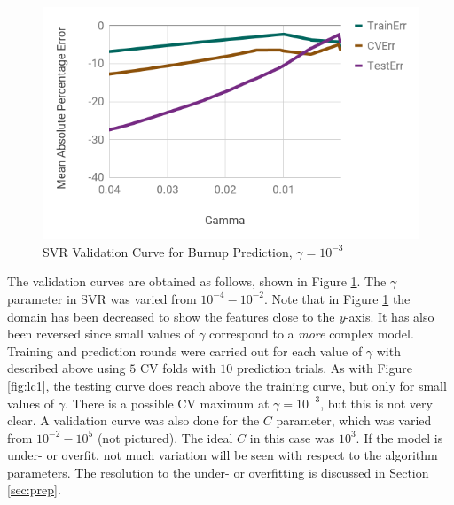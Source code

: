 \begin{figure}[!htb]
    \centering
    \includegraphics[width=\linewidth]{./chapters/method/vc1.png}
    \caption{\acrshort{SVR} Validation Curve for Burnup Prediction, $\gamma = 10^{-3}$}
    \label{fig:vc1}
\end{figure}

The validation curves are obtained as follows, shown in Figure \ref{fig:vc1}.
The $\gamma$ parameter in \gls{SVR} was varied from $10^{-4}-10^{-2}$.  Note
that in Figure \ref{fig:vc1} the domain has been decreased to show the features
close to the \textit{y}-axis.  It has also been reversed since small values of
$\gamma$ correspond to a \textit{more} complex model.  Training and prediction
rounds were carried out for each value of $\gamma$ with described above using
$5$ \gls{CV} folds with $10$ prediction trials.  As with Figure \ref{fig:lc1},
the testing curve does reach above the training curve, but only for small
values of $\gamma$.  There is a possible \gls{CV} maximum at $\gamma=10^{-3}$,
but this is not very clear.  A validation curve was also done for the $C$
parameter, which was varied from $10^{-2}-10^{5}$ (not pictured). The ideal $C$
in this case was $10^{3}$.  If the model is under- or overfit, not much
variation will be seen with respect to the algorithm parameters. The resolution
to the under- or overfitting is discussed in Section \ref{sec:prep}.


